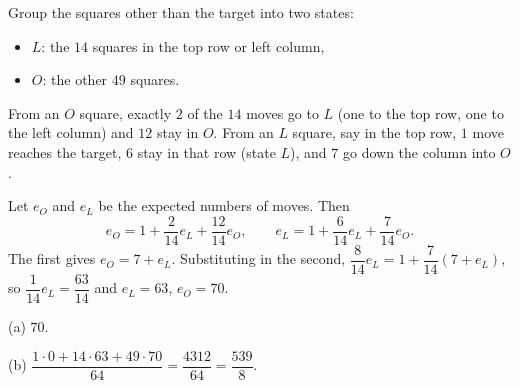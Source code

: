Group the squares other than the target into two states:
\begin{itemize}
\item $L$: the $14$ squares in the top row or left column,
\item $O$: the other $49$ squares.
\end{itemize}
From an $O$ square, exactly $2$ of the $14$ moves go to $L$ (one to the top row, one to the left column) and $12$ stay in $O$. From an $L$ square, say in the top row, $1$ move reaches the target, $6$ stay in that row (state $L$), and $7$ go down the column into $O$.

Let $e_O$ and $e_L$ be the expected numbers of moves. Then
\[e_O=1+\dfrac{2}{14}e_L+\dfrac{12}{14}e_O,\qquad e_L=1+\dfrac6{14}e_L+\dfrac7{14}e_O.\]
The first gives $e_O=7+e_L$. Substituting in the second, $\dfrac8{14}e_L=1+\dfrac7{14}(7+e_L)$, so $\dfrac1{14}e_L=\dfrac{63}{14}$ and $e_L=63$, $e_O=70$.

(a) $\boxed{70}$.

(b) $\dfrac{1\cdot0+14\cdot63+49\cdot70}{64}=\dfrac{4312}{64}=\boxed{\dfrac{539}{8}}$.
